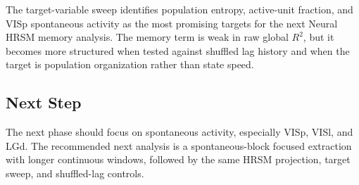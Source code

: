 The target-variable sweep identifies population entropy, active-unit fraction, and VISp spontaneous activity as the most promising targets for the next Neural HRSM memory analysis. The memory term is weak in raw global \(R^2\), but it becomes more structured when tested against shuffled lag history and when the target is population organization rather than state speed.

\subsection{Next Step}

The next phase should focus on spontaneous activity, especially VISp, VISl, and LGd. The recommended next analysis is a spontaneous-block focused extraction with longer continuous windows, followed by the same HRSM projection, target sweep, and shuffled-lag controls.
